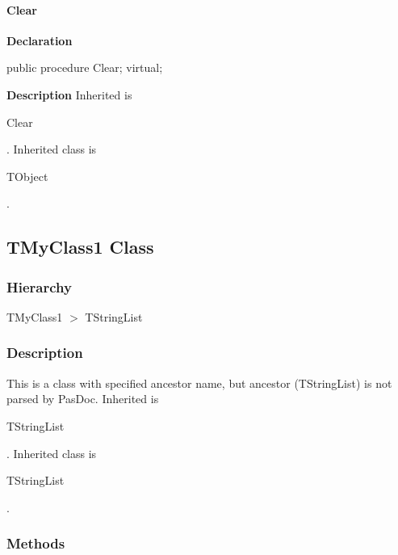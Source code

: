 \documentclass{report}
\begin{document}
\paragraph*{Clear}\hspace*{\fill}

\begin{list}{}{
\setlength{\itemindent}{0cm}
\setlength{\listparindent}{0cm}
\setlength{\leftmargin}{\evensidemargin}
\addtolength{\leftmargin}{\tmplength}
\settowidth{\labelsep}{X}
\addtolength{\leftmargin}{\labelsep}
\setlength{\labelwidth}{\tmplength}
}
\begin{flushleft}
\item[\textbf{Declaration}\hfill]
\begin{ttfamily}
public procedure Clear; virtual;\end{ttfamily}


\end{flushleft}
\par
\item[\textbf{Description}]
Inherited is \begin{ttfamily}Clear\end{ttfamily}. Inherited class is \begin{ttfamily}TObject\end{ttfamily}.

\end{list}
\subsection*{TMyClass1 Class}
\subsubsection*{\large{\textbf{Hierarchy}}\normalsize\hspace{1ex}\hfill}
TMyClass1 {$>$} TStringList
\subsubsection*{\large{\textbf{Description}}\normalsize\hspace{1ex}\hfill}
This is a class with specified ancestor name, but ancestor (TStringList) is not parsed by PasDoc. Inherited is \begin{ttfamily}TStringList\end{ttfamily}. Inherited class is \begin{ttfamily}TStringList\end{ttfamily}.\subsubsection*{\large{\textbf{Methods}}\normalsize\hspace{1ex}\hfill}
\end{document}
